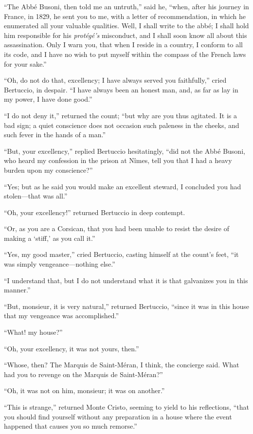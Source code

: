 “The Abbé Busoni, then told me an untruth,” said he, “when, after his
journey in France, in 1829, he sent you to me, with a letter of
recommendation, in which he enumerated all your valuable qualities.
Well, I shall write to the abbé; I shall hold him responsible for his
\textit{protégé’s} misconduct, and I shall soon know all about this
assassination. Only I warn you, that when I reside in a country, I
conform to all its code, and I have no wish to put myself within the
compass of the French laws for your sake.”

“Oh, do not do that, excellency; I have always served you faithfully,”
cried Bertuccio, in despair. “I have always been an honest man, and, as
far as lay in my power, I have done good.”

“I do not deny it,” returned the count; “but why are you thus agitated.
It is a bad sign; a quiet conscience does not occasion such paleness in
the cheeks, and such fever in the hands of a man.”

“But, your excellency,” replied Bertuccio hesitatingly, “did not the
Abbé Busoni, who heard my confession in the prison at Nîmes, tell you
that I had a heavy burden upon my conscience?”

“Yes; but as he said you would make an excellent steward, I concluded
you had stolen—that was all.”

“Oh, your excellency!” returned Bertuccio in deep contempt.

“Or, as you are a Corsican, that you had been unable to resist the
desire of making a ‘stiff,’ as you call it.”

“Yes, my good master,” cried Bertuccio, casting himself at the count’s
feet, “it was simply vengeance—nothing else.”

“I understand that, but I do not understand what it is that galvanizes
you in this manner.”

“But, monsieur, it is very natural,” returned Bertuccio, “since it was
in this house that my vengeance was accomplished.”

“What! my house?”

“Oh, your excellency, it was not yours, then.”

“Whose, then? The Marquis de Saint-Méran, I think, the concierge said.
What had you to revenge on the Marquis de Saint-Méran?”

“Oh, it was not on him, monsieur; it was on another.”

“This is strange,” returned Monte Cristo, seeming to yield to his
reflections, “that you should find yourself without any preparation in
a house where the event happened that causes you so much remorse.”


